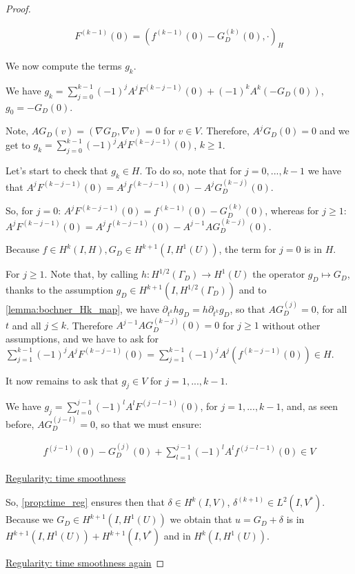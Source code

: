 \documentclass[english,a4paper,10pt,oneside]{scrbook}	%
\theoremstyle{break}
\newenvironment{mproof}[1][\proofname]{%
  \begin{proof}[#1]$ $\par\nobreak\ignorespaces
}{%
  \end{proof}
}
\renewcommand*{\proofname}{Proof}
\theoremstyle{remark}
\begin{document}
\begin{mproof}
\begin{align*}
	F^{(k-1)}(0) = (f^{(k-1)}(0) - G^{(k)}_D (0), \cdot)_H
\end{align*}

We now compute the terms $g_k$.

We have $g_k = \sum_{j=0}^{k-1}(-1)^j A^j F^{(k-j-1)}(0) + (-1)^k A^k( - G_D(0))$, $g_0 = -G_D(0)$.


Note, $AG_D(v) = (\nabla G_D, \nabla v )=0$ for $v \in V$. Therefore, $A^jG_D(0)=0$ and we get to $g_k = \sum_{j=0}^{k-1}(-1)^j A^j F^{(k-j-1)}(0)$, $k \geq 1$.

Let's start to check that $g_k \in H$. To do so, note that for $j=0, ..., k-1$ we have that $A^j F^{(k-j-1)}(0) = A^j f^{(k-j-1)}(0)  -A^j G^{(k-j)}_D (0)$.

So, for $j=0$: $A^j F^{(k-j-1)}(0) = f^{(k-1)}(0)  - G^{(k)}_D (0)$, whereas for $j\geq1$: $A^j F^{(k-j-1)}(0) = A^jf^{(k-j-1)}(0)  -A^{j-1} A G^{(k-j)}_D (0)$.

Because $f \in H^k(I,H), G_D \in H^{k+1}(I, H^1(U))$, the term for $j=0$ is in $H$.

For $j\geq1$. Note that, by calling $h: H^{1/2}(\Gamma_D)\rightarrow H^1(U)$ the operator $g_D\mapsto G_D$, thanks to the assumption $g_D \in H^{k+1}(I, H^{1/2}(\Gamma_D))$ and to \cref{lemma:bochner_Hk_map}, we have $\partial_{t^k} h g_D = h \partial_{t^k} g_D$, so that $A G^{(j)}_D = 0$, for all $t$ and all $j\leq k$. Therefore $A^{j-1} A G^{(k-j)}_D (0)=0$ for $j\geq 1$ without other assumptions, and we have to ask for $ \sum_{j=1}^{k-1}(-1)^j A^j F^{(k-j-1)}(0) = \sum_{j=1}^{k-1}(-1)^jA^j(f^{(k-j-1)}(0))\in H$.

It now remains to ask that $g_j \in V$ for $j=1,...,k-1$.

We have $g_j = \sum_{l=0}^{j-1}(-1)^l A^l F^{(j-l-1)}(0)$, for $j=1,...,k-1$, and, as seen before, $AG_D^{(j-l)}=0$, so that we must ensure:

\begin{align*}
	f^{(j-1)}(0) - G_D^{(j)}(0) + \sum_{l=1}^{j-1}(-1)^l A^l f^{(j-l-1)}(0)  \in V
\end{align*}

\underline{Regularity: time smoothness}

So, \cref{prop:time_reg} ensures then that $\delta \in H^k(I,V)$, $\delta^{(k+1)} \in L^2(I,V^*)$. Because we $G_D \in H^{k+1}(I,H^1(U))$ we obtain that $u = G_D + \delta$ is in $H^{k+1}(I,H^1(U)) + H^{k+1}(I,V^*)$ and in $H^k(I,H^{1}(U))$.

\underline{Regularity: time smoothness again}


\end{mproof}
\end{document}
